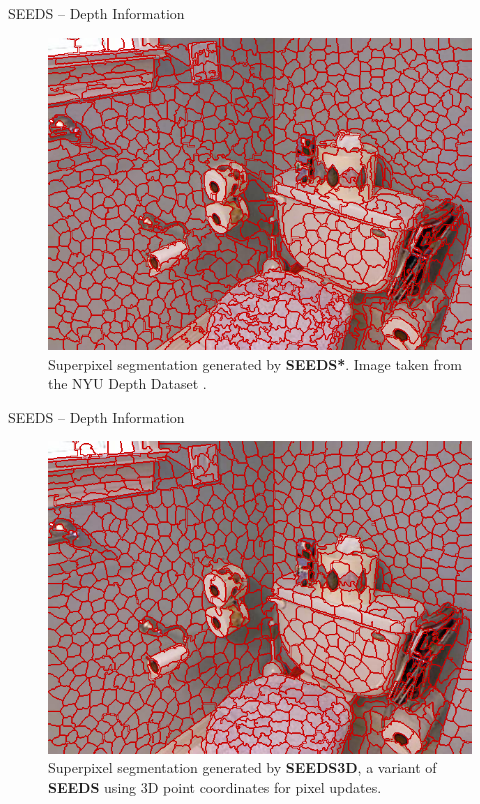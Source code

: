 \documentclass[handout]{beamer}
\begin{document}
	\begin{frame}{SEEDS -- Depth Information}
		\begin{figure}
   			\centering
   			\includegraphics[scale=0.33]{images/nyu-3-reseedssm}
   			\caption{Superpixel segmentation generated by \textbf{SEEDS*}. Image taken from the NYU Depth Dataset \cite{SilbermanHoiemKohliFergus:2012}.}
   		\end{figure}
	\end{frame}
	
	\begin{frame}{SEEDS -- Depth Information}
		\begin{figure}
   			\centering
   			\includegraphics[scale=0.33]{images/nyu-3-seeds3d}
   			\caption{Superpixel segmentation generated by \textbf{SEEDS3D}, a variant of \textbf{SEEDS} using 3D point coordinates for pixel updates.}
   		\end{figure}
	\end{frame}
	
\end{document}

